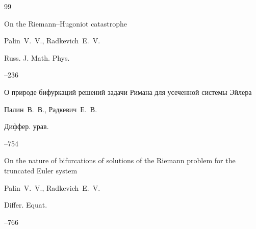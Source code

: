 \begin{thebibliography}{99}







\paper On the Riemann--Hugoniot catastrophe 	

\by Palin~V.~V., Radkevich~E.~V.


\jour Russ. J. Math. Phys. 





--236 





\paper О природе бифуркаций решений задачи Римана для усеченной системы Эйлера

\by Палин~В.~В., Радкевич~Е.~В.

\jour Диффер. урав.




--754


\transl

\paper On the nature of bifurcations of solutions of the Riemann problem for the truncated Euler system

\by Palin~V.~V., Radkevich~E.~V.

\jour Differ. Equat.




--766







\end{thebibliography}
